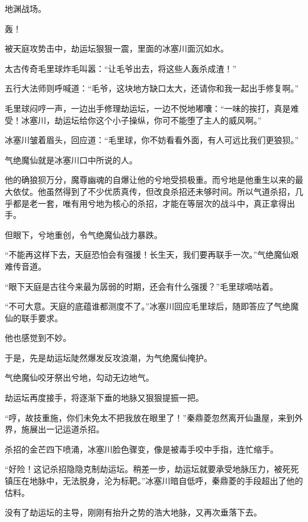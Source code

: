 
\begin{this_body}

地渊战场。

轰！

被天庭攻势击中，劫运坛狠狠一震，里面的冰塞川面沉如水。

太古传奇毛里球炸毛叫嚣：“让毛爷出去，将这些人轰杀成渣！”

五行大法师则呼喊道：“毛爷，这块地方缺口太大，还请你和我一起出手修复啊。”

毛里球闷哼一声，一边出手修理劫运坛，一边不悦地嘟囔：“一味的挨打，真是难受！冰塞川，劫运坛给你这个小子操纵，你可不能堕了主人的威风啊。”

冰塞川皱着眉头，回应道：“毛里球，你不妨看看外面，有人可远比我们更狼狈。”

气绝魔仙就是冰塞川口中所说的人。

他的确狼狈万分，魔尊幽魂的自爆让他的兮地受损极重。而兮地是他重生以来的最大依仗。他虽然得到了不少优质真传，但改良杀招还未够时间。所以气道杀招，几乎都是老一套，唯有用兮地为核心的杀招，才能在等层次的战斗中，真正拿得出手。

但眼下，兮地重创，令气绝魔仙战力暴跌。

“不能再这样下去，天庭恐怕会有强援！长生天，我们要再联手一次。”气绝魔仙艰难传音道。

“眼下天庭是古往今来最为孱弱的时期，还会有什么强援？”毛里球嘀咕着。

“不可大意。天庭的底蕴谁都测度不了。”冰塞川回应毛里球后，随即答应了气绝魔仙的联手要求。

他也感觉到不妙。

于是，先是劫运坛陡然爆发反攻浪潮，为气绝魔仙掩护。

气绝魔仙咬牙祭出兮地，勾动无边地气。

劫运坛再度接手，将逐渐下垂的地脉又狠狠提振一把。

“哼，故技重施，你们未免太不把我放在眼里了！”秦鼎菱忽然离开仙蛊屋，来到外界，施展出一记运道杀招。

杀招的金芒四下喷涌，冰塞川脸色骤变，像是被毒手咬中手指，连忙缩手。

“好险！这记杀招隐隐克制劫运坛。稍差一步，劫运坛就要承受地脉压力，被死死镇压在地脉中，无法脱身，沦为标靶。”冰塞川暗自低呼，秦鼎菱的手段超出了他的估料。

没有了劫运坛的主导，刚刚有抬升之势的浩大地脉，又再次垂落下去。


\end{this_body}
